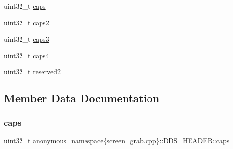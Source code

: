 \begin{DoxyCompactItemize}
\item 
uint32\+\_\+t \mbox{\hyperlink{structanonymous__namespace_02screen__grab_8cpp_03_1_1_d_d_s___h_e_a_d_e_r_aa0287169efb03d6b874dab700c51af24}{caps}}
\item 
uint32\+\_\+t \mbox{\hyperlink{structanonymous__namespace_02screen__grab_8cpp_03_1_1_d_d_s___h_e_a_d_e_r_a48b0612b0258463cb71ce436fc1ece2e}{caps2}}
\item 
uint32\+\_\+t \mbox{\hyperlink{structanonymous__namespace_02screen__grab_8cpp_03_1_1_d_d_s___h_e_a_d_e_r_adc16988d8cc0eb4bbb5b0caec429d589}{caps3}}
\item 
uint32\+\_\+t \mbox{\hyperlink{structanonymous__namespace_02screen__grab_8cpp_03_1_1_d_d_s___h_e_a_d_e_r_ab6871a410a32d89b83870cf4ab09277c}{caps4}}
\item 
uint32\+\_\+t \mbox{\hyperlink{structanonymous__namespace_02screen__grab_8cpp_03_1_1_d_d_s___h_e_a_d_e_r_ad7629ade3e922d85d9080f59ffb430c5}{reserved2}}
\end{DoxyCompactItemize}


\subsection{Member Data Documentation}
\mbox{\label{structanonymous__namespace_02screen__grab_8cpp_03_1_1_d_d_s___h_e_a_d_e_r_aa0287169efb03d6b874dab700c51af24}} 
\subsubsection{\texorpdfstring{caps}{caps}}
{\footnotesize\ttfamily uint32\+\_\+t anonymous\+\_\+namespace\{screen\+\_\+grab.\+cpp\}\+::D\+D\+S\+\_\+\+H\+E\+A\+D\+E\+R\+::caps}

\mbox{\label{structanonymous__namespace_02screen__grab_8cpp_03_1_1_d_d_s___h_e_a_d_e_r_a48b0612b0258463cb71ce436fc1ece2e}} 

